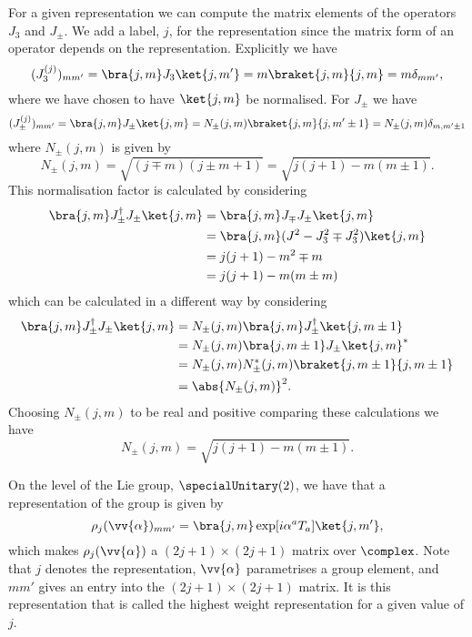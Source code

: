 For a given representation we can compute the matrix elements of the operators \(J_3\) and \(J_{\pm}\).
We add a label, \(j\), for the representation since the matrix form of an operator depends on the representation.
Explicitly we have
\begin{equation}
    (J_3^{(j)})_{mm'} = \bra{j, m} J_3 \ket{j, m'} = m\braket{j, m}{j, m} = m \delta_{mm'},
\end{equation}
where we have chosen to have \(\ket{j, m}\) be normalised.
For \(J_{\pm}\) we have
\begin{equation}
    (J_{\pm}^{(j)})_{mm'} = \bra{j, m}J_{\pm} \ket{j, m} = N_{\pm}(j, m) \braket{j, m}{j, m' \pm 1} = N_{\pm}(j, m)\delta_{m, m'\pm 1}
\end{equation}
where \(N_{\pm}(j, m)\) is given by
\begin{equation}
    N_{\pm}(j, m) = \sqrt{(j \mp m)(j \pm m + 1)} = \sqrt{j(j + 1) - m(m \pm 1)}.
\end{equation}
This normalisation factor is calculated by considering
\begin{align}
    \bra{j, m} J_{\pm}^{\hermit} J_{\pm} \ket{j, m} &= \bra{j, m} J_{\mp} J_{\pm} \ket{j, m}\\
    &= \bra{j, m}(J^2 - J_3^2 \mp J_3^2)\ket{j, m}\\
    &= j(j + 1) - m^2 \mp m\\
    &= j(j + 1) - m(m \pm m)
\end{align}
which can be calculated in a different way by considering
\begin{align}
    \bra{j, m} J_{\pm}^\hermit J_{\pm} \ket{j, m} &= N_{\pm}(j, m)\bra{j, m} J_{\pm}^{\hermit} \ket{j, m \pm 1}\\
    &= N_{\pm}(j, m)\bra{j, m\pm 1}J_{\pm}\ket{j, m}^*\\
    &= N_{\pm}(j, m)N_{\pm}^*(j, m) \braket{j, m \pm 1}{j, m \pm 1}\\
    &= \abs{N_{\pm}(j, m)}^2.
\end{align}
Choosing \(N_{\pm}(j, m)\) to be real and positive comparing these calculations we have
\begin{equation}
    N_{\pm}(j, m) = \sqrt{j(j + 1) - m(m \pm 1)}.
\end{equation}

On the level of the Lie group, \(\specialUnitary(2)\), we have that a representation of the group is given by
\begin{equation}
    \rho_j(\vv{\alpha})_{mm'} = \bra{j, m}\exp[i\alpha^aT_a]\ket{j, m'},
\end{equation}
which makes \(\rho_j(\vv{\alpha})\) a \((2j + 1) \times (2j + 1)\) matrix over \(\complex\).
Note that \(j\) denotes the representation, \(\vv{\alpha}\) parametrises a group element, and \(mm'\) gives an entry into the \((2j + 1) \times (2j + 1)\) matrix.
It is this representation that is called the highest weight representation for a given value of \(j\).

